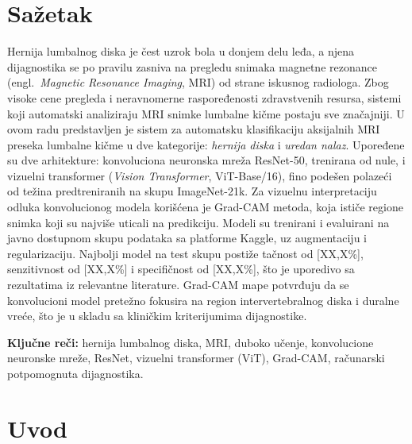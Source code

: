 \documentclass[12pt,a4paper]{article}
\begin{document}
\thispagestyle{fancy}
\section*{Sažetak}

Hernija lumbalnog diska je čest uzrok bola u donjem delu leđa, a njena dijagnostika
se po pravilu zasniva na pregledu snimaka magnetne rezonance (engl.\ \textit{Magnetic
Resonance Imaging}, MRI) od strane iskusnog radiologa. Zbog visoke cene pregleda i
neravnomerne raspoređenosti zdravstvenih resursa, sistemi koji automatski analiziraju
MRI snimke lumbalne kičme postaju sve značajniji. U ovom radu predstavljen je sistem
za automatsku klasifikaciju aksijalnih MRI preseka lumbalne kičme u dve kategorije:
\textit{hernija diska} i \textit{uredan nalaz}. Upoređene su dve arhitekture:
konvoluciona neuronska mreža ResNet-50, trenirana od nule, i vizuelni transformer
(\textit{Vision Transformer}, ViT-Base/16), fino podešen polazeći od težina
predtreniranih na skupu ImageNet-21k. Za vizuelnu interpretaciju odluka konvolucionog
modela korišćena je Grad-CAM metoda, koja ističe regione snimka koji su najviše uticali
na predikciju. Modeli su trenirani i evaluirani na javno dostupnom skupu podataka sa
platforme Kaggle, uz augmentaciju i regularizaciju. Najbolji model na test skupu postiže
tačnost od [XX{,}X\%], senzitivnost od [XX{,}X\%] i specifičnost od [XX{,}X\%], što je
uporedivo sa rezultatima iz relevantne literature. Grad-CAM mape potvrđuju da se
konvolucioni model pretežno fokusira na region
intervertebralnog diska i duralne vreće, što je u skladu sa kliničkim kriterijumima
dijagnostike.

\vspace{0.3cm}
\noindent\textbf{Ključne reči:} hernija lumbalnog diska, MRI, duboko učenje,
konvolucione neuronske mreže, ResNet, vizuelni transformer (ViT), Grad-CAM,
računarski potpomognuta dijagnostika.

\newpage
\tableofcontents
\newpage

\section{Uvod}
\label{sec:uvod}
\end{document}
